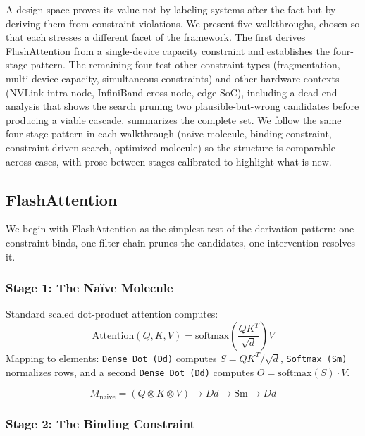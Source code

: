 \documentclass[10pt,twocolumn]{article}
\begin{document}
A design space proves its value not by labeling systems after the fact but by deriving them from constraint violations. We present five walkthroughs, chosen so that each stresses a different facet of the framework. The first derives FlashAttention from a single-device capacity constraint and establishes the four-stage pattern. The remaining four test other constraint types (fragmentation, multi-device capacity, simultaneous constraints) and other hardware contexts (NVLink intra-node, InfiniBand cross-node, edge SoC), including a dead-end analysis that shows the search pruning two plausible-but-wrong candidates before producing a viable cascade.  summarizes the complete set. We follow the same four-stage pattern in each walkthrough (na\"ive molecule, binding constraint, constraint-driven search, optimized molecule) so the structure is comparable across cases, with prose between stages calibrated to highlight what is new.



\subsection{FlashAttention}
\label{sec:fa-walkthrough}

We begin with FlashAttention \citep{dao2022} as the simplest test of the derivation pattern: one constraint binds, one filter chain prunes the candidates, one intervention resolves it.

\subsubsection{Stage 1: The Na\"ive Molecule}

Standard scaled dot-product attention \citep{vaswani2017attention} computes:
\[
\text{Attention}(Q, K, V) = \text{softmax}\!\left(\frac{QK^T}{\sqrt{d}}\right) V
\]
Mapping to elements: \texttt{Dense Dot (Dd)} computes $S = QK^T / \sqrt{d}$, \texttt{Softmax (Sm)} normalizes rows, and a second \texttt{Dense Dot (Dd)} computes $O = \text{softmax}(S) \cdot V$.

\begin{equation}
M_{\text{naive}} = (Q \otimes K \otimes V) \rightarrow Dd \rightarrow \text{Sm} \rightarrow Dd
\end{equation}

\subsubsection{Stage 2: The Binding Constraint}
\end{document}
